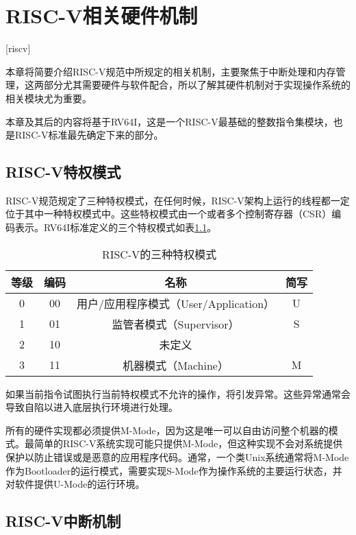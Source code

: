 
\chapter{RISC-V相关硬件机制}[riscv]
\label{chapter:riscv}

本章将简要介绍RISC-V规范中所规定的相关机制，主要聚焦于中断处理和内存管理，这两部分尤其需要硬件与软件配合，所以了解其硬件机制对于实现操作系统的相关模块尤为重要。

本章及其后的内容将基于RV64I，这是一个RISC-V最基础的整数指令集模块，也是RISC-V标准最先确定下来的部分。

\section{RISC-V特权模式}

RISC-V规范规定了三种特权模式，在任何时候，RISC-V架构上运行的线程都一定位于其中一种特权模式中。这些特权模式由一个或者多个控制寄存器（CSR）编码表示。RV64I标准定义的三个特权模式如表\ref{tab:privilege}。

\begin{table}[h]
	\centering
	\setlength{\belowcaptionskip}{2pt}
	\caption{RISC-V的三种特权模式}
	\label{tab:privilege}
	\begin{tabular}{cccc}
		\hline
		等级 & 编码 & 名称                          & 简写 \\ \hline
		0  & 00 & 用户/应用程序模式（User/Application） & U  \\ 
		1  & 01 & 监管者模式（Supervisor）           & S  \\ 
		2  & 10 & 未定义                         &    \\ 
		3  & 11 & 机器模式（Machine）               & M  \\ \hline
	\end{tabular}
\end{table}

如果当前指令试图执行当前特权模式不允许的操作，将引发异常。这些异常通常会导致自陷以进入底层执行环境进行处理。

所有的硬件实现都必须提供M-Mode，因为这是唯一可以自由访问整个机器的模式。最简单的RISC-V系统实现可能只提供M-Mode，但这种实现不会对系统提供保护以防止错误或是恶意的应用程序代码。通常，一个类Unix系统通常将M-Mode作为Bootloader的运行模式，需要实现S-Mode作为操作系统的主要运行状态，并对软件提供U-Mode的运行环境。

\section{RISC-V中断机制}
\label{sec:interrupt}

